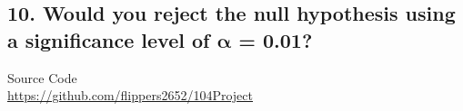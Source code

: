 \documentclass[12pt,oneside]{book}
\begin{document}
\begin{minipage}{.96\textwidth}
\subsection*{10. Would you reject the null hypothesis using a significance level of $\boldsymbol{\alpha}$ = 0.01?}
\ifdim \pvalue pt>0.01pt {
I would not reject the null hypothesis at $\alpha = 0.01$ as $p=\pvalue>0.01$. Also $0 \in \intervalB$.
} \else {
I would reject the null hypothesis at $\alpha = 0.01$ as $p=\pvalue<0.01$. Also $0 \not\in \intervalB$.
} \fi
\end{minipage}%

\begin{tcolorbox}
{\large Source Code}\\
\url{https://github.com/flippers2652/104Project}
\end{tcolorbox}
\end{document}
